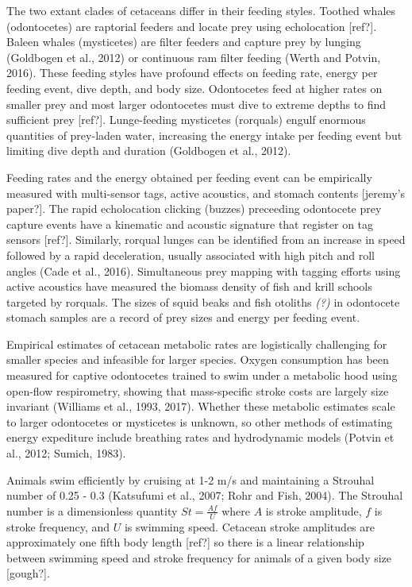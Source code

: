 \documentclass[]{elsarticle} %
\begin{document}
The two extant clades of cetaceans differ in their feeding styles.
Toothed whales (odontocetes) are raptorial feeders and locate prey using
echolocation {[}ref?{]}. Baleen whales (mysticetes) are filter feeders
and capture prey by lunging (Goldbogen et al., 2012) or continuous ram
filter feeding (Werth and Potvin, 2016). These feeding styles have
profound effects on feeding rate, energy per feeding event, dive depth,
and body size. Odontocetes feed at higher rates on smaller prey and most
larger odontocetes must dive to extreme depths to find sufficient prey
{[}ref?{]}. Lunge-feeding mysticetes (rorquals) engulf enormous
quantities of prey-laden water, increasing the energy intake per feeding
event but limiting dive depth and duration (Goldbogen et al., 2012).

Feeding rates and the energy obtained per feeding event can be
empirically measured with multi-sensor tags, active acoustics, and
stomach contents {[}jeremy's paper?{]}. The rapid echolocation clicking
(buzzes) preceeding odontocete prey capture events have a kinematic and
acoustic signature that register on tag sensors {[}ref?{]}. Similarly,
rorqual lunges can be identified from an increase in speed followed by a
rapid deceleration, usually associated with high pitch and roll angles
(Cade et al., 2016). Simultaneous prey mapping with tagging efforts
using active acoustics have measured the biomass density of fish and
krill schools targeted by rorquals. The sizes of squid beaks and fish
otoliths \emph{(?)} in odontocete stomach samples are a record of prey
sizes and energy per feeding event.

Empirical estimates of cetacean metabolic rates are logistically
challenging for smaller species and infeasible for larger species.
Oxygen consumption has been measured for captive odontocetes trained to
swim under a metabolic hood using open-flow respirometry, showing that
mass-specific stroke costs are largely size invariant (Williams et al.,
1993, 2017). Whether these metabolic estimates scale to larger
odontocetes or mysticetes is unknown, so other methods of estimating
energy expediture include breathing rates and hydrodynamic models
(Potvin et al., 2012; Sumich, 1983).

Animals swim efficiently by cruising at 1-2 m/s and maintaining a
Strouhal number of 0.25 - 0.3 (Katsufumi et al., 2007; Rohr and Fish,
2004). The Strouhal number is a dimensionless quantity
\(St = \frac{Af}{U}\) where \(A\) is stroke amplitude, \(f\) is stroke
frequency, and \(U\) is swimming speed. Cetacean stroke amplitudes are
approximately one fifth body length {[}ref?{]} so there is a linear
relationship between swimming speed and stroke frequency for animals of
a given body size {[}gough?{]}.
\end{document}
